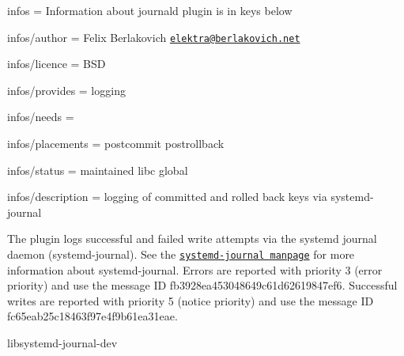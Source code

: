 
\begin{DoxyItemize}
\item infos = Information about journald plugin is in keys below
\item infos/author = Felix Berlakovich \href{mailto:elektra@berlakovich.net}{\tt elektra@berlakovich.\+net}
\item infos/licence = B\+S\+D
\item infos/provides = logging
\item infos/needs =
\item infos/placements = postcommit postrollback
\item infos/status = maintained libc global
\item infos/description = logging of committed and rolled back keys via systemd-\/journal
\end{DoxyItemize}

The plugin logs successful and failed write attempts via the systemd journal daemon (systemd-\/journal). See the \href{http://www.freedesktop.org/software/systemd/man/systemd-journald.service.html}{\tt systemd-\/journal manpage} for more information about systemd-\/journal. Errors are reported with priority 3 (error priority) and use the message I\+D {\ttfamily fb3928ea453048649c61d62619847ef6}. Successful writes are reported with priority 5 (notice priority) and use the message I\+D {\ttfamily fc65eab25c18463f97e4f9b61ea31eae}.


\begin{DoxyItemize}
\item {\ttfamily libsystemd-\/journal-\/dev} 
\end{DoxyItemize}